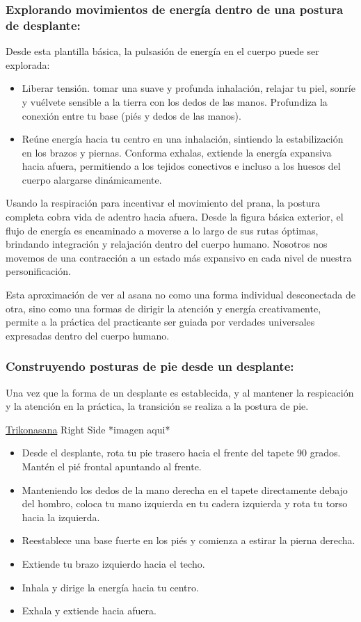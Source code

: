 \subsubsection{Explorando movimientos de energía dentro de una postura de desplante:}
Desde esta plantilla básica, la pulsasión de energía en el cuerpo puede ser explorada:
\begin{itemize}
	\item Liberar tensión. tomar una suave y profunda inhalación, relajar tu piel, sonríe y vuélvete sensible a la tierra con los dedos de las manos. Profundiza la conexión entre tu base (piés y dedos de las manos).
	\item Reúne energía hacia tu centro en una inhalación, sintiendo la estabilización en los brazos y piernas. Conforma exhalas, extiende la energía expansiva hacia afuera, permitiendo a los tejidos conectivos e incluso a los huesos del cuerpo alargarse dinámicamente.
\end{itemize}

Usando la respiración para incentivar el movimiento del prana, la postura completa cobra vida de adentro hacia afuera. Desde la figura básica exterior, el flujo de energía es encaminado a moverse a lo largo de sus rutas óptimas, brindando integración y relajación dentro del cuerpo humano. Nosotros nos movemos de una contracción a un estado más expansivo en cada nivel de nuestra personificación.

Esta aproximación de ver al asana no como una forma individual desconectada de otra, sino como una formas de dirigir la atención y energía creativamente, permite a la práctica del practicante ser guiada por verdades universales expresadas dentro del cuerpo humano.

\subsubsection{Construyendo posturas de pie desde un desplante:}
Una vez que la forma de un desplante es establecida, y al mantener la respicación y la atención en la práctica, la transición se realiza a la postura de pie.

\underline{Trikonasana}
Right Side
*imagen aqui*
\begin{itemize}
	\item Desde el desplante, rota tu pie trasero hacia el frente del tapete 90 grados. Mantén el pié frontal apuntando al frente.
	\item Manteniendo los dedos de la mano derecha en el tapete directamente debajo del hombro, coloca tu mano izquierda en tu cadera izquierda y rota tu torso hacia la izquierda.
	\item Reestablece una base fuerte en los piés y comienza a estirar la pierna derecha.
	\item Extiende tu brazo izquierdo hacia el techo.
	\item Inhala y dirige la energía hacia tu centro.
	\item Exhala y extiende hacia afuera.
\end{itemize}

